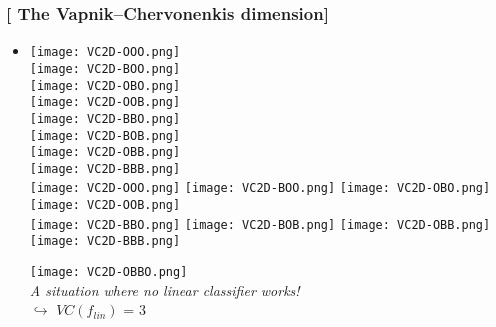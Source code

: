 \documentclass[xcolor=x11names,compress, handhouts]{beamer}
\renewcommand{\(}{\begin{columns}}
\renewcommand{\)}{\end{columns}}
\newcommand{\<}[1]{\begin{column}{#1}}
\renewcommand{\>}{\end{column}}
\begin{document}
\begin{frame} %
\frametitle{\textcolor{brique}{[ The  Vapnik–Chervonenkis dimension]}}
\pause
\begin{itemize}
  \item[] 
    {\texttt{[image: VC2D-OOO.png]} \\ }
    {\texttt{[image: VC2D-BOO.png]} \\ }
    {\texttt{[image: VC2D-OBO.png]} \\ }
    {\texttt{[image: VC2D-OOB.png]}  \\ }
    {\texttt{[image: VC2D-BBO.png]} \\ }
    {\texttt{[image: VC2D-BOB.png]} \\ }
    {\texttt{[image: VC2D-OBB.png]} \\ }
    {\texttt{[image: VC2D-BBB.png]}  \\ }
    { \texttt{[image: VC2D-OOO.png]}
               \texttt{[image: VC2D-BOO.png]}
               \texttt{[image: VC2D-OBO.png]}
               \texttt{[image: VC2D-OOB.png]}\\
               \vspace{1cm} 
               \texttt{[image: VC2D-BBO.png]}
               \texttt{[image: VC2D-BOB.png]}
               \texttt{[image: VC2D-OBB.png]}
               \texttt{[image: VC2D-BBB.png]} \\  }
   
    {\texttt{[image: VC2D-OBBO.png]}  \\ }
    {\emph{A situation where no linear classifier works!} \\
            $\hookrightarrow$ $VC(f_{lin})$ = 3}
\end{itemize}
\end{frame}
\end{document}
